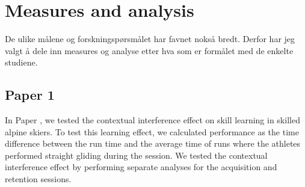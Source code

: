 





\section{Measures and analysis}
De ulike målene og forskningspørsmålet har favnet nokså bredt. Derfor har jeg valgt å dele inn measures og analyse etter hva som er formålet med de enkelte studiene. 


\subsection{Paper 1}
In Paper , we tested the contextual interference effect on skill learning in skilled alpine skiers. To test this learning effect, we calculated performance as the time difference between the run time and the average time of runs where the athletes performed straight gliding during the session. We tested the contextual interference effect by performing separate analyses for the acquisition and retention sessions.

